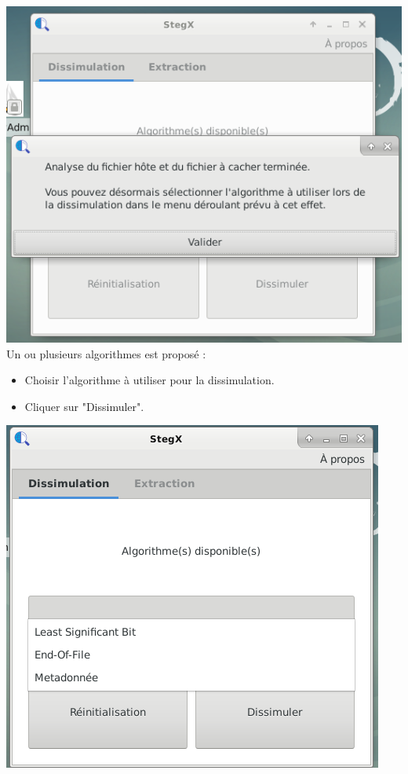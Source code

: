 \documentclass[11pt]{article}
\begin{document}
\vspace{0.5cm}
\hspace{2cm}
\includegraphics[scale=0.8]{pictures/insertion_2.png}
\vspace{1cm}
\newpage
Un ou plusieurs algorithmes est proposé : 
\begin{itemize}
\item Choisir l'algorithme à utiliser pour la dissimulation.
\item Cliquer sur "Dissimuler". 
\end{itemize}

\vspace{0.5cm}
\hspace{2cm}
\includegraphics[scale=0.8]{pictures/insertion_3.png}
\end{document}
